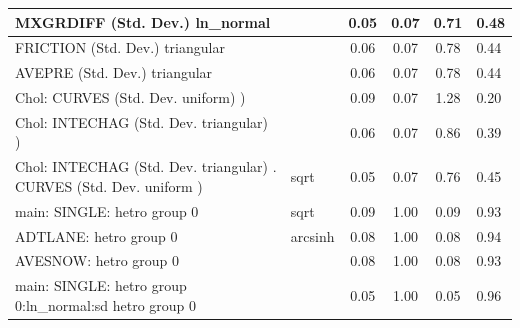\begin{table}
\begin{center}
\begin{tabular}{|l|l|c|c|c|l|}
			\hline
			MXGRDIFF (Std. Dev.) ln_normal &  & 0.05 & 0.07 & 0.71 & 0.48 \\
			\hline
			FRICTION (Std. Dev.) triangular &  & 0.06 & 0.07 & 0.78 & 0.44 \\
			\hline
			AVEPRE (Std. Dev.) triangular &  & 0.06 & 0.07 & 0.78 & 0.44 \\
			\hline
			 Chol: CURVES (Std. Dev. uniform) ) &  & 0.09 & 0.07 & 1.28 & 0.20 \\
			\hline
			 Chol: INTECHAG (Std. Dev. triangular) ) &  & 0.06 & 0.07 & 0.86 & 0.39 \\
			\hline
			 Chol: INTECHAG (Std. Dev. triangular) . CURVES (Std. Dev.   uniform ) & sqrt & 0.05 & 0.07 & 0.76 & 0.45 \\
			\hline
			main: SINGLE: hetro group 0 & sqrt & 0.09 & 1.00 & 0.09 & 0.93 \\
			\hline
			ADTLANE: hetro group 0 & arcsinh & 0.08 & 1.00 & 0.08 & 0.94 \\
			\hline
			AVESNOW: hetro group 0 &  & 0.08 & 1.00 & 0.08 & 0.93 \\
			\hline
			main: SINGLE: hetro group 0:ln_normal:sd  hetro group 0 &  & 0.05 & 1.00 & 0.05 & 0.96 \\
			\hline
		\end{tabular}
	\end{center}
\end{table}